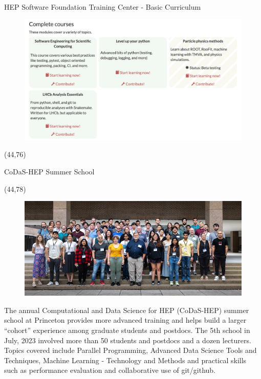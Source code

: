 \documentclass[final]{beamer}
\begin{document}
\begin{frame}{}
\begin{textblock}{38.0}
\begin{block}{HEP Software Foundation Training Center - Basic Curriculum}
\begin{textblock}{19.0}
\begin{figure}[tbph]
\end{figure}
\begin{figure}[tbph]
\centering
\includegraphics[width=1.00\textwidth]{images/hsf-training-6.png}
\end{figure}
\end{textblock}
\end{block}
\end{textblock}



\begin{textblock}{38.0}(44,76)
\begin{block}{CoDaS-HEP Summer School}
\begin{textblock}{38.0}(44,78)
\begin{figure}[tbph]
\centering
\includegraphics[width=1.00\textwidth]{images/codas-hep-2023-group-photo-thumbnail.jpg}
\end{figure}
The annual Computational and Data Science for HEP (CoDaS-HEP) summer school at Princeton provides more advanced training and helps build a larger ``cohort'' experience among graduate students and postdocs. The 5th school in July, 2023 involved more than 50 students and postdocs and a dozen lecturers. Topics covered include Parallel Programming, Advanced Data Science Tools and Techniques, Machine Learning - Technology and Methods and practical skills such as performance evaluation and collaborative use of git/github.
\end{textblock}
\end{block}
\end{textblock}



\end{frame}
\end{document}
